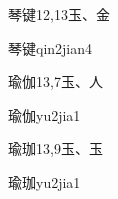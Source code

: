 \begin{entry}{琴键}{12,13}{⽟、⾦}
  \begin{phonetics}{琴键}{qin2jian4}
  \end{phonetics}
\end{entry}

\begin{entry}{瑜伽}{13,7}{⽟、⼈}
  \begin{phonetics}{瑜伽}{yu2jia1}
  \end{phonetics}
\end{entry}

\begin{entry}{瑜珈}{13,9}{⽟、⽟}
  \begin{phonetics}{瑜珈}{yu2jia1}
  \end{phonetics}
\end{entry}


